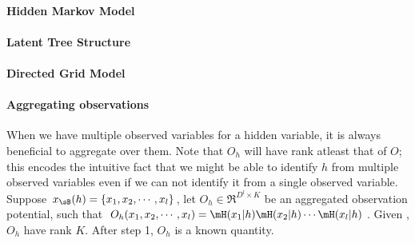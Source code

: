 \begin{figure}
  \label{fig:examples}
\end{figure}


\paragraph{Hidden Markov Model}

\paragraph{Latent Tree Structure}

\paragraph{Directed Grid Model}

\paragraph{Aggregating observations}

When we have multiple observed variables for a hidden variable, it is
  always beneficial to aggregate over them.
Note that $O_h$ will have rank atleast that of $O$; this encodes the
  intuitive fact that we might be able to identify $h$ from multiple
  observed variables even if we can not identify it from a single
  observed variable. 
Suppose $x_\sB(h) = \{x_1, x_2, \cdots, x_l\}$, let $O_h \in
  \Re^{D^l \times K}$ be an
  aggregated observation potential, such that $O_h(x_1, x_2, \cdots,
  x_l) = \mH(x_1|h) \mH(x_2|h) \cdots \mH(x_l|h)$.
Given , $O_h$ have rank $K$.
After step 1, $O_h$ is a known quantity.
